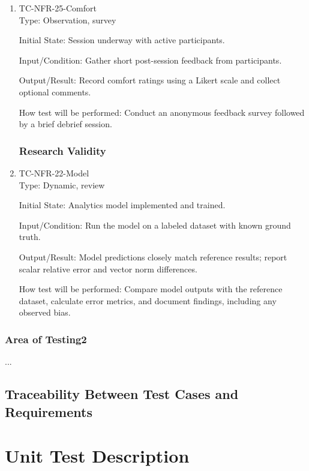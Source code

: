 \documentclass[12pt, titlepage]{article}
\begin{document}
\begin{enumerate}
\item{TC-NFR-25-Comfort\\}
Type: Observation, survey

Initial State: Session underway with active participants.

Input/Condition: Gather short post-session feedback from participants.

Output/Result: Record comfort ratings using a Likert scale and collect optional comments.

How test will be performed: Conduct an anonymous feedback survey followed by a brief debrief session.

\subsubsection{Research Validity}

\item{TC-NFR-22-Model\\}
Type: Dynamic, review

Initial State: Analytics model implemented and trained.

Input/Condition: Run the model on a labeled dataset with known ground truth.

Output/Result: Model predictions closely match reference results; report scalar relative error and vector norm differences.

How test will be performed: Compare model outputs with the reference dataset, calculate error metrics, and document findings, including any observed bias.

\end{enumerate}

\subsubsection{Area of Testing2}

...

\subsection{Traceability Between Test Cases and Requirements}


\section{Unit Test Description}
\end{document}
